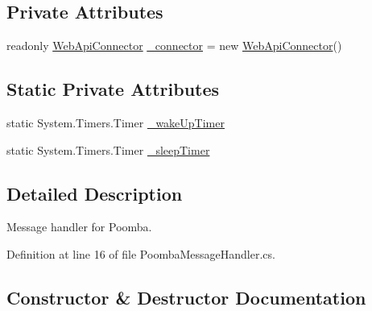 \subsection*{Private Attributes}
\begin{DoxyCompactItemize}
\item 
readonly \mbox{\hyperlink{class_master_application_1_1_web_api_connector}{Web\+Api\+Connector}} \mbox{\hyperlink{class_master_application_1_1_message_handlers_1_1_poomba_message_handler_a2d2bdedd9c715df9a7e1242a25febe64}{\+\_\+connector}} = new \mbox{\hyperlink{class_master_application_1_1_web_api_connector}{Web\+Api\+Connector}}()
\end{DoxyCompactItemize}
\subsection*{Static Private Attributes}
\begin{DoxyCompactItemize}
\item 
static System.\+Timers.\+Timer \mbox{\hyperlink{class_master_application_1_1_message_handlers_1_1_poomba_message_handler_af6f6704f46dcb6b8dff593a24fe1ada0}{\+\_\+wake\+Up\+Timer}}
\item 
static System.\+Timers.\+Timer \mbox{\hyperlink{class_master_application_1_1_message_handlers_1_1_poomba_message_handler_af0f6ef136986d40f0063c713603fc938}{\+\_\+sleep\+Timer}}
\end{DoxyCompactItemize}


\subsection{Detailed Description}
Message handler for Poomba. 

Definition at line 16 of file Poomba\+Message\+Handler.\+cs.



\subsection{Constructor \& Destructor Documentation}
\mbox{\label{class_master_application_1_1_message_handlers_1_1_poomba_message_handler_a79b0fb9c31b4e159e84f4f5fc6c4230e}} 

